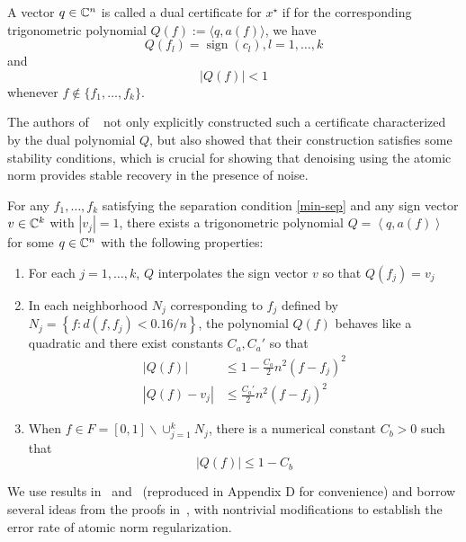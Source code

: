 \begin{definition}
\label{dual-cert}
A vector $q \in \mathbb{C}^n$ is called a dual certificate for $x^\star$ if for the corresponding trigonometric polynomial $Q(f) := \langle q, a(f) \rangle$, we have
$$Q(f_l) = \operatorname{sign}(c_l), l = 1, \ldots, k$$  and $$|Q(f)| < 1$$ whenever $f\not\in \{ f_1, \ldots, f_k\}$.
\end{definition}
The authors of ~\cite{cg_exact12} not only explicitly constructed 
such a certificate characterized by the dual polynomial $Q$, but also showed that their construction satisfies some stability conditions, which is crucial for showing that denoising using the atomic norm provides stable recovery in the presence of noise.

\begin{theorem}
\label{dual-stab} For any $f_1, \ldots, f_k$ satisfying the separation condition \eqref{min-sep} and any sign vector $v \in \mathbb{C}^k$ with $|v_j|=1$, there exists a trigonometric polynomial $Q = \left<q, a(f)\right>$ for some $q \in \mathbb{C}^n$ with the following properties: 
\begin{enumerate}
\item For each $j = 1, \ldots, k$, $Q$ interpolates the sign vector $v$ so that $Q(f_j) = v_j$
\item In each neighborhood $N_j$ corresponding to $f_j$ defined by
$N_j = \left\{ f : d(f, f_j) < {0.16}/{n} \right\}$, 
the polynomial $Q(f)$ behaves like a quadratic and there exist constants $C_a, C_a'$ so that
\begin{align}
\label{q1}|Q(f)| & \leq 1 - \frac{C_a}{2} n^2 (f-f_j)^2\\
\label{q2}|Q(f) - v_j| & \leq \frac{C_a'}{2} n^2 (f - f_j)^2
\end{align}
\item When $f \in F = [0,1] \backslash \cup_{j=1}^k{N_j}$, there is a numerical constant $C_b>0$ such that
\[
|Q(f)| \leq 1 - C_b
\]
\end{enumerate}
\end{theorem}

We use results in~\cite{cg_noisy} and~\cite{btr12} (reproduced in Appendix D for convenience) and borrow several ideas from the proofs in~\cite{cg_noisy}, with nontrivial modifications to establish the error rate of atomic norm regularization.

